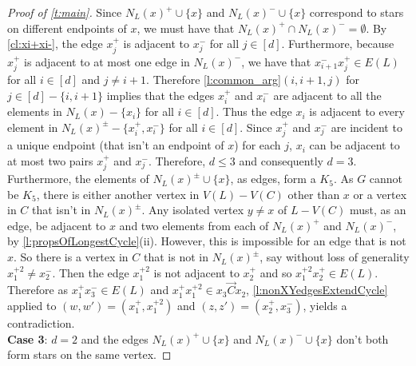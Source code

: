 \documentclass[10pt,a4paper]{amsart}
\newcommand{\ora}{\overrightarrow{C}}
\begin{document}
\begin{proof}[Proof of \cref{t:main}]
Since $N_L(x)^+ \cup \{x\}$ and $N_L(x)^- \cup \{x\}$ correspond to stars on different endpoints of $x$, we must have that $N_L(x)^+ \cap N_L(x)^- =\emptyset$. 
By \cref{cl:xi+xi-}, the edge $x_j^+$ is adjacent to $x_j^-$ for all $j \in [d]$. Furthermore, because $x_j^+$ is adjacent to at most one edge in $N_L(x)^-$, we have that $x_{i+1}^- x_{j}^+ \in E(L)$ for all $i \in [d]$ and $j\neq i+1$.
Therefore \cref{l:common_arg}$(i,i+1,j)$ for $j \in [d]-\{i,i+1\}$ implies that the edges $x_i^+$ and $x_i^-$ are adjacent to all the elements in $N_L(x)-\{x_i\}$ 
for all $i\in [d]$.
Thus the edge $x_i$ is adjacent to every element in $N_L(x)^\pm-\{x_i^+,x_i^-\}$  for all $i\in [d]$. Since $x_j^+$ and $x_j^-$ are incident to a unique endpoint (that isn't an endpoint of $x$) for each $j$, $x_i$ can be adjacent to at most two pairs $x_j^+$ and $x_j^-$. Therefore, $d \leq 3$ and consequently $d=3$. Furthermore, the elements of $N_L(x)^\pm\cup \{x \}$, as edges, form a $K_5$.
As $G$ cannot be $K_5$, there is either another vertex in $V(L)-V(C)$ other than $x$ or a vertex in $C$ that isn't in  $N_L(x)^\pm $.
Any isolated vertex $y \neq x$ of $L-V(C)$ must, as an edge, be adjacent to $x$ and two elements from each of $N_L(x)^+$ and $N_L(x)^-$, by \cref{l:propsOfLongestCycle}(ii). However, this 
is impossible for an edge that is not $x$.
So there is a vertex in $C$ that is not in $N_L(x)^\pm$, say without loss of generality $x_1^{+2} \neq x_2^-$. Then the edge $x_1^{+2}$ is not adjacent to $x_2^+$ and so $x_1^{+2}x_2^+ \in E(L)$. Therefore as $x_1^+ x_3^{-} \in E(L)$ and $x_1^+ x_1^{+2} \in x_3\ora x_2$, \cref{l:nonXYedgesExtendCycle} applied to $(w,w')=(x_1^+,x_1^{+2})$ and $(z,z')=(x_2^+,x_3^-)$, yields a contradiction.
$ $\\

\noindent \textbf{Case 3}: $d=2$ and the edges
$N_L(x)^+ \cup \{x\}$ and $N_L(x)^- \cup \{x\}$ don't both form stars on the same vertex.


\end{proof}
\end{document}
